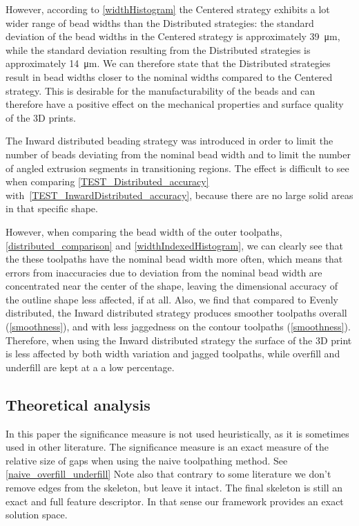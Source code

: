 However, according to \cref{widthHistogram} the Centered strategy exhibits a lot wider range of bead widths than the Distributed strategies:
the standard deviation of the bead widths in the Centered strategy is approximately \SI{39}{\micro\meter}, while the standard deviation resulting from the Distributed strategies is approximately \SI{14}{\micro\meter}.
We can therefore state that the Distributed strategies result in bead widths closer to the nominal widths compared to the Centered strategy.
This is desirable for the manufacturability of the beads and can therefore have a positive effect on the mechanical properties and surface quality of the 3D prints. 

The Inward distributed beading strategy was introduced in order to limit the number of beads deviating from the nominal bead width and to limit the number of angled extrusion segments in transitioning regions.
The effect is difficult to see when comparing \cref{TEST_Distributed_accuracy} with~\ref{TEST_InwardDistributed_accuracy}, because there are no large solid areas in that specific shape.

However, when comparing the bead width of the outer toolpaths, \cref{distributed_comparison} and  \cref{widthIndexedHistogram}, we can clearly see that the these toolpaths have the nominal bead width more often, which means that errors from inaccuracies due to deviation from the nominal bead width are concentrated near the center of the shape, leaving the dimensional accuracy of the outline shape less affected, if at all. 
Also, we find that compared to Evenly distributed, the Inward distributed strategy produces smoother toolpaths overall (\cref{smoothness}), and with less jaggedness on the contour toolpaths (\cref{smoothness}). 
Therefore, when using the Inward distributed strategy the surface of the 3D print is less affected by both width variation and jagged toolpaths, while overfill and underfill are kept at a a low percentage.


\subsection{Theoretical analysis}
In this paper the significance measure is not used heuristically, as it is sometimes used in other literature.
The significance measure is an exact measure of the relative size of gaps when using the naive toolpathing method.
See \cref{naive_overfill_underfill}
Note also that contrary to some literature we don't remove edges from the skeleton, but leave it intact.
The final skeleton is still an exact and full feature descriptor.
In that sense our framework provides an exact solution space.

